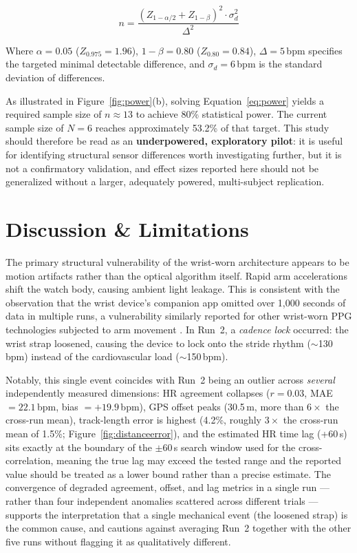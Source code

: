\documentclass{acmsiggraph}
\begin{document}
	\begin{equation}
		n = \frac{(Z_{1-\alpha/2}+Z_{1-\beta})^2 \cdot \sigma_d^2}{\Delta^2}
		\label{eq:power}
	\end{equation}
	
	Where $\alpha=0.05$ ($Z_{0.975}=1.96$), $1-\beta=0.80$ ($Z_{0.80}=0.84$),
	$\Delta=5$\,bpm specifies the targeted minimal detectable difference, and
	$\sigma_d=6$\,bpm is the standard deviation of differences.
	
	As illustrated in Figure~\ref{fig:power}(b), solving Equation~\ref{eq:power}
	yields a required sample size of $n\approx13$ to achieve 80\% statistical
	power. The current sample size of $N=6$ reaches approximately 53.2\% of
	that target. This study should therefore be read as an
	\textbf{underpowered, exploratory pilot}: it is useful for identifying
	structural sensor differences worth investigating further, but it is not
	a confirmatory validation, and effect sizes reported here should not be
	generalized without a larger, adequately powered, multi-subject
	replication.
	
	\section{Discussion \& Limitations}
	
	The primary structural vulnerability of the wrist-worn architecture
	appears to be motion artifacts rather than the optical algorithm itself.
	Rapid arm accelerations shift the watch body, causing ambient light
	leakage. This is consistent with the observation that the wrist device's
	companion app omitted over 1,000 seconds of data in multiple runs, a
	vulnerability similarly reported for other wrist-worn PPG technologies
	subjected to arm movement \cite{schweizer2024heart}. In Run~2, a
	\emph{cadence lock} occurred: the wrist strap loosened, causing the
	device to lock onto the stride rhythm ($\sim$130\,bpm) instead of the
	cardiovascular load ($\sim$150\,bpm).
	
	Notably, this single event coincides with Run~2 being an outlier across
	\emph{several} independently measured dimensions: HR agreement collapses
	($r=0.03$, MAE $=22.1$\,bpm, bias $=+19.9$\,bpm), GPS offset peaks
	(30.5\,m, more than $6\times$ the cross-run mean), track-length error is
	highest (4.2\%, roughly $3\times$ the cross-run mean of 1.5\%;
	Figure~\ref{fig:distanceerror}), and the
	estimated HR time lag (+60\,s) sits exactly at the boundary of the
	$\pm60$\,s search window used for the cross-correlation, meaning the true
	lag may exceed the tested range and the reported value should be treated
	as a lower bound rather than a precise estimate. The convergence of
	degraded agreement, offset, and lag metrics in a single run --- rather
	than four independent anomalies scattered across different trials ---
	supports the interpretation that a single mechanical event (the loosened
	strap) is the common cause, and cautions against averaging Run~2 together
	with the other five runs without flagging it as qualitatively different.
	
\end{document}
